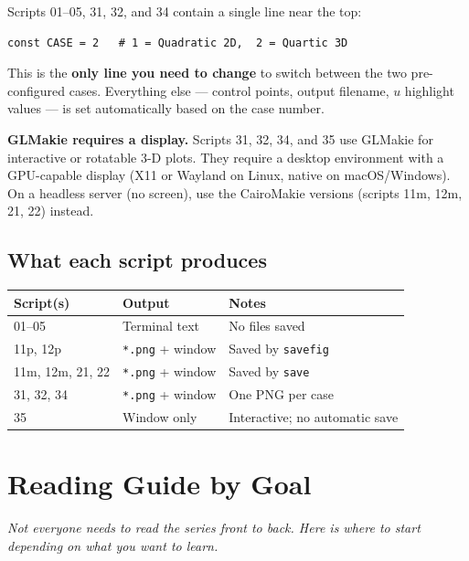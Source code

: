 \documentclass[12pt, a4paper]{article}
\newcommand{\cd}[1]{\texttt{#1}}
\begin{document}
Scripts 01--05, 31, 32, and 34 contain a single line
near the top:

\begin{verbatim}
const CASE = 2   # 1 = Quadratic 2D,  2 = Quartic 3D
\end{verbatim}

This is the \textbf{only line you need to change} to
switch between the two pre-configured cases.
Everything else --- control points, output filename,
$u$ highlight values --- is set automatically based on
the case number.

\begin{notebox}
\textbf{GLMakie requires a display.}
Scripts 31, 32, 34, and 35 use GLMakie for interactive
or rotatable 3-D plots.
They require a desktop environment with a GPU-capable
display (X11 or Wayland on Linux, native on macOS/Windows).
On a headless server (no screen), use the CairoMakie
versions (scripts 11m, 12m, 21, 22) instead.
\end{notebox}

\subsection{What each script produces}

\begin{center}
\begin{tabular}{lll}
\toprule
Script(s) & Output & Notes \\
\midrule
01--05 & Terminal text & No files saved \\
11p, 12p & \cd{*.png} + window & Saved by \cd{savefig} \\
11m, 12m, 21, 22 & \cd{*.png} + window & Saved by \cd{save} \\
31, 32, 34 & \cd{*.png} + window & One PNG per case \\
35 & Window only & Interactive; no automatic save \\
\bottomrule
\end{tabular}
\end{center}


\section{Reading Guide by Goal}

\textit{Not everyone needs to read the series front to back.
Here is where to start depending on what you want to learn.}
\end{document}
